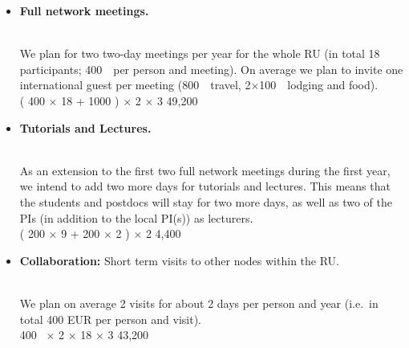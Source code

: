 \documentclass[10pt,fleqn,twoside]{article}
\begin{document}
\begin{itemize}
\item
\begin{Emphasize}
{\bf Full network meetings.}
\end{Emphasize}\\
We plan for two two-day meetings per year for the whole RU (in total 18
participants; 400~\EUR{}\ per person and meeting). On average we plan to 
invite one international guest per meeting (800~\EUR{}\ travel, 2$\times$100~\EUR{}\ 
lodging and food).\vspace{0.2em}\\
( 400 \EUR{} $\times$ 18 +  1000 \EUR{} ) $\times$ 2 $\times$ 3  \hfill 49,200~\EUR{}\\
\item
\begin{Emphasize}
{\bf Tutorials and Lectures.}
\end{Emphasize}\\
As an extension to the first two full network meetings during the first year, we
intend to add two more days for tutorials and lectures. This means that the
students and postdocs will stay for two more days, as well as two of the PIs
(in addition to the local PI(s)) as lecturers.
\vspace{0.2em}\\
( 200 \EUR{} $\times$ 9 + 200 \EUR{} $\times$ 2 ) $\times$ 2  \hfill 4,400~\EUR{}\\
\item 
\begin{Emphasize}
{\bf Collaboration:} Short term visits to other nodes within the RU.
\end{Emphasize}\\
We plan on average 2 visits for about 2 days per person and year
(i.e.\ in total 400 EUR per person and visit).
\vspace{0.2em}\\
400~\EUR{} $\times$ 2 $\times$ 18 $\times$ 3    \hfill 43,200~\EUR{}\\

\end{itemize}
\end{document}
